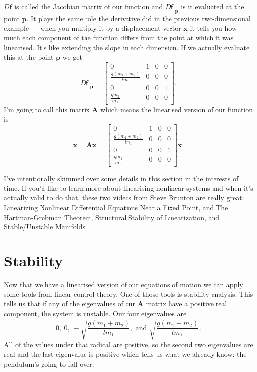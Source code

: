 \documentclass{article}
\renewcommand{\vec}[1]{\boldsymbol{\mathbf{#1}}}
\newcommand{\dvec}[1]{\dot{\vec{#1}}}
\begin{document}
$D \vec{f}$ is called the Jacobian matrix of our function and $D \vec{f}|_{\vec{p}}$ is it evaluated at the point $\vec{p}$. It plays the same role the derivative did in the previous two-dimensional example — when you multiply it by a displacement vector $\vec{x}$ it tells you how much each component of the function differs from the point at which it was linearised. It's like extending the slope in each dimension. If we actually evaluate this at the point $\vec{p}$ we get \[D \vec{f}|_{\vec{p}} = \begin{bmatrix}
    0                           & 1 & 0 & 0 \\
    \frac{g (m_1 + m_2)}{l m_1} & 0 & 0 & 0 \\
    0                           & 0 & 0 & 1 \\
    \frac{g m_2}{m_1}           & 0 & 0 & 0
\end{bmatrix}.\] I'm going to call this matrix $\vec{A}$ which means the linearised version of our function is \[\dvec{x} = \vec{A} \vec{x} = \begin{bmatrix}
    0                           & 1 & 0 & 0 \\
    \frac{g (m_1 + m_2)}{l m_1} & 0 & 0 & 0 \\
    0                           & 0 & 0 & 1 \\
    \frac{g m_2}{m_1}           & 0 & 0 & 0
  \end{bmatrix} \vec{x}.\]

I've intentionally skimmed over some details in this section in the interests of time. If you'd like to learn more about linearising nonlinear systems and when it's actually valid to do that, these two videos from Steve Brunton are really great: \href{https://www.youtube.com/watch?v=RCWkzzLgwf0}{Linearizing Nonlinear Differential Equations Near a Fixed Point}, and \href{https://www.youtube.com/watch?v=vRaUSnB7qNw}{The Hartman-Grobman Theorem, Structural Stability of Linearization, and Stable/Unstable Manifolds}.

\section{Stability}

Now that we have a linearised version of our equations of motion we can apply some tools from linear control theory. One of those tools is stability analysis. This tells us that if any of the eigenvalues of our $\vec{A}$ matrix have a positive real component, the system is unstable. Our four eigenvalues are \[0, \ 0, \ -\sqrt{\frac{g (m_1 + m_2)}{l m_1}}, \text{ and } \sqrt{\frac{g (m_1 + m_2)}{l m_1}}.\] All of the values under that radical are positive, so the second two eigenvalues are real and the last eigenvalue is positive which tells us what we already know: the pendulum's going to fall over.
\end{document}
